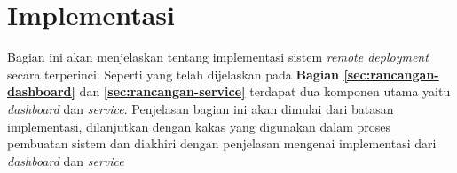 \section{Implementasi}

Bagian ini akan menjelaskan tentang implementasi sistem \textit{remote deployment} secara terperinci. Seperti yang telah dijelaskan pada  \textbf{Bagian \ref{sec:rancangan-dashboard}} dan \textbf{\ref{sec:rancangan-service}} terdapat dua komponen utama yaitu \textit{dashboard} dan \textit{service}. Penjelasan bagian ini akan dimulai dari batasan implementasi, dilanjutkan dengan kakas yang digunakan dalam proses pembuatan sistem dan diakhiri dengan penjelasan mengenai implementasi dari \textit{dashboard} dan \textit{service}
















% 
% 
% 
% 
% 


